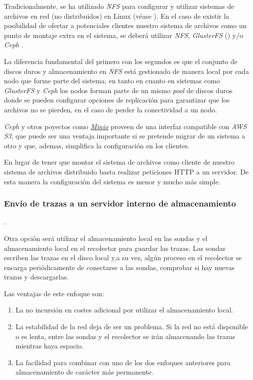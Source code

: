 Tradicionalmente, se ha utilizado \emph{NFS} para configurar y utilizar sistemas de archivos en red (no distribuidos) en Linux (véase \cite{wiki-nfs}). 
En el caso de existir la posibilidad de ofertar a potenciales clientes nuestro sistema de archivos como un punto de montaje extra en el sistema, se deberá utilizar
\emph{NFS}, \emph{GlusterFS} (\cite{wiki-glusterfs}) y/o \emph{Ceph} \cite{wiki-ceph}.

La diferencia fundamental del primero con los segundos es que el conjunto de discos duros y almacenamiento en \emph{NFS} está gestionado de manera local
por cada nodo que forme parte del sistema, en tanto en cuanto en sistemas como \emph{GlusterFS} y \emph{Ceph} los nodos forman parte de un 
mismo \emph{pool} de discos duros donde se pueden configurar opciones de replicación para garantizar que los archivos no se pierden, en el caso de perder la conectividad a un nodo.

\emph{Ceph} y otros poyectos como \emph{\href{https://minio.io/}{Minio}} proveen de una interfaz compatible con \emph{AWS S3}, que puede ser una ventaja importante
si se pretende migrar de un sistema a otro y que, ademas, simplifica la configuración en los clientes.

En lugar de tener que montar el sistema de archivos como cliente de nuestro sistema de archivos distribuido basta 
realizar peticiones HTTP a un servidor. De esta manera la configuración del sistema es menor y mucho más simple.

\subsubsection{Envío de trazas a un servidor interno de almacenamiento}.

Otra opción será utilizar el almacenamiento local en las sondas y el almacenamiento local en el recolector para guardar las trazas.
Las sondas escriben las trazas en el disco local y,a su vez, algún proceso en el recolector se encarga periódicamente de conectarse a las sondas,
comprobar si hay nuevas trazas y descargarlas.

Las ventajas de este enfoque son:
\begin{enumerate}
    \item La no incursión en costes adicional por utilizar el almacenamiento local.
    \item La estabilidad de la red deja de ser un problema. Si la red no está disponible o es lenta, entre las sondas y el recolector se irán almacenando las trazas mientras haya espacio.
    \item La facilidad para combinar con uno de los dos enfoques anteriores para almacenamiento de carácter más permanente.
\end{enumerate}

